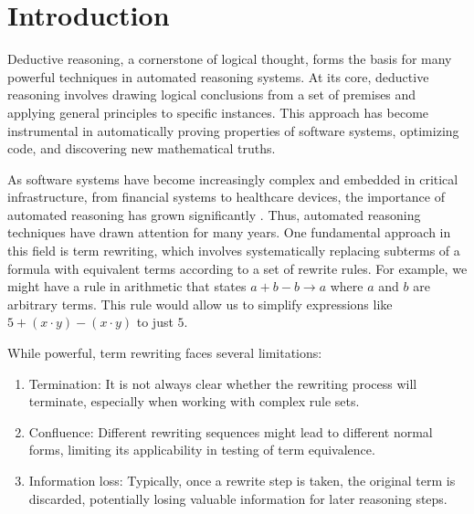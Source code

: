\chapter{Introduction}
\label{chap:intro}



Deductive reasoning, a cornerstone of logical thought, forms the basis for many powerful techniques in automated reasoning systems. 
At its core, deductive reasoning involves drawing logical conclusions from a set of premises and applying general principles to specific instances. 
This approach has become instrumental in automatically proving properties of software systems, optimizing code, and discovering new mathematical truths.

As software systems have become increasingly complex and embedded in critical infrastructure, from financial systems to healthcare devices, the importance of automated reasoning has grown significantly \cite{d2008survey}. 
Thus, automated reasoning techniques have drawn attention for many years. 
One fundamental approach in this field is term rewriting, which involves systematically replacing subterms of a formula with equivalent terms according to a set of rewrite rules. 
For example, we might have a rule in arithmetic that states $a + b - b \rightarrow a$ where $a$ and $b$ are arbitrary terms. 
This rule would allow us to simplify expressions like $5 + (x\cdot y) - (x\cdot y)$ to just $5$.

While powerful, term rewriting faces several limitations:
\begin{enumerate}
    \item Termination: It is not always clear whether the rewriting process will terminate, especially when working with complex rule sets.
    \item Confluence: Different rewriting sequences might lead to different normal forms, limiting its applicability in testing of term equivalence.
    \item Information loss: Typically, once a rewrite step is taken, the original term is discarded, potentially losing valuable information for later reasoning steps.
\end{enumerate}

